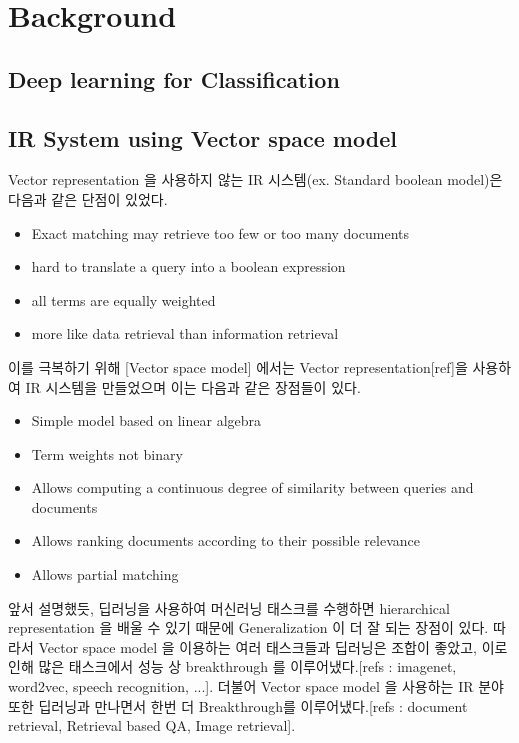 

\section{Background}


\subsection{Deep learning for Classification }


\subsection{IR System using Vector space model}
Vector representation 을 사용하지 않는 IR 시스템(ex. Standard boolean model)은 다음과 같은 단점이 있었다.
\begin{itemize}
\item Exact matching may retrieve too few or too many documents
\item hard to translate a query into a boolean expression
\item all terms are equally weighted
\item more like data retrieval than information retrieval
\end{itemize}


이를 극복하기 위해 [Vector space model] 에서는 Vector representation[ref]을 사용하여 IR 시스템을 만들었으며 이는 다음과 같은 장점들이 있다.

\begin{itemize}
\item Simple model based on linear algebra
\item Term weights not binary
\item Allows computing a continuous degree of similarity between queries and documents
\item Allows ranking documents according to their possible relevance
\item Allows partial matching
\end{itemize}


앞서 설명했듯, 딥러닝을 사용하여 머신러닝 태스크를 수행하면 hierarchical representation 을 배울 수 있기 때문에 Generalization 이 더 잘 되는 장점이 있다. 따라서 Vector space model 을 이용하는 여러 태스크들과 딥러닝은 조합이 좋았고, 이로인해 많은 태스크에서 성능 상 breakthrough 를 이루어냈다.[refs : imagenet, word2vec, speech recognition, ...]. 더불어 Vector space model 을 사용하는 IR 분야 또한 딥러닝과 만나면서 한번 더 Breakthrough를 이루어냈다.[refs : document retrieval, Retrieval based QA, Image retrieval]. 

